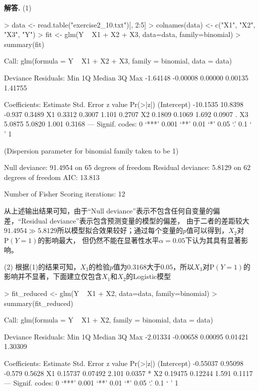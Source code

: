 \documentclass[12pt, a4paper, oneside]{ctexart}
\newenvironment{solution}[1][]{\par\noindent\textbf{#1解答. }}{\smallskip\par}  %
\def\P{\textrm{P}}          %
\begin{document}
\begin{solution}
    (1)\begin{rcode}
> data <- read.table("exercise2_10.txt")[, 2:5]
> colnames(data) <- c("X1", "X2", "X3", "Y")
> fit <- glm(Y ~ X1 + X2 + X3, data=data, family=binomial)
> summary(fit)

Call:
glm(formula = Y ~ X1 + X2 + X3, family = binomial, data = data)

Deviance Residuals: 
     Min        1Q    Median        3Q       Max  
-1.64148  -0.00008   0.00000   0.00135   1.41755  

Coefficients:
            Estimate Std. Error z value Pr(>|z|)  
(Intercept) -10.1535    10.8398  -0.937   0.3489  
X1            0.3312     0.3007   1.101   0.2707  
X2            0.1809     0.1069   1.692   0.0907 .
X3            5.0875     5.0820   1.001   0.3168  
---
Signif. codes:  0 ‘***’ 0.001 ‘**’ 0.01 ‘*’ 0.05 ‘.’ 0.1 ‘ ’ 1

(Dispersion parameter for binomial family taken to be 1)

    Null deviance: 91.4954  on 65  degrees of freedom
Residual deviance:  5.8129  on 62  degrees of freedom
AIC: 13.813

Number of Fisher Scoring iterations: 12

    \end{rcode}
    从上述输出结果可知，由于“Null deviance”表示不包含任何自变量的偏差，“Residual deviance”表示包含预测变量的模型的偏差，
    由于二者的差距较大$91.4954 \gg 5.8129$所以模型拟合效果较好；通过每个变量的$p$值可以得到，$X_2$对$\P(Y=1)$的影响最大，
    但仍然不能在显著性水平$\alpha =0.05$下认为其具有显著影响。

    (2) 根据(1)的结果可知，$X_3$的检验$p$值为$0.3168$大于$0.05$，所以$X_3$对$\P(Y=1)$的影响并不显著，下面建立仅包含$X_1$和$X_2$的Logistic模型
    \begin{rcode}
> fit_reduced <- glm(Y ~ X1 + X2, data=data, family=binomial)
> summary(fit_reduced)

Call:
glm(formula = Y ~ X1 + X2, family = binomial, data = data)

Deviance Residuals: 
     Min        1Q    Median        3Q       Max  
-2.01334  -0.00658   0.00095   0.01421   1.30309  

Coefficients:
            Estimate Std. Error z value Pr(>|z|)  
(Intercept) -0.55037    0.95098  -0.579   0.5628  
X1           0.15737    0.07492   2.101   0.0357 *
X2           0.19475    0.12244   1.591   0.1117  
---
Signif. codes:  0 ‘***’ 0.001 ‘**’ 0.01 ‘*’ 0.05 ‘.’ 0.1 ‘ ’ 1


\end{rcode}
\end{solution}
\end{document}
